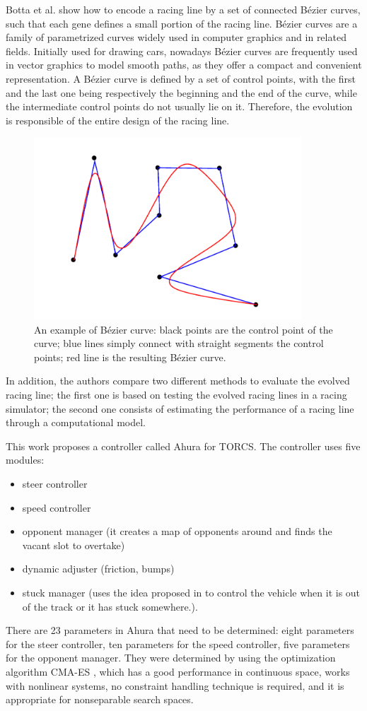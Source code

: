 Botta et al. \cite{botta} show how to encode a racing line by a set of connected B\'{e}zier curves, such that each gene defines a small portion of the racing line. B\'{e}zier curves are a family of parametrized curves widely used in computer graphics and in related fields. Initially used for drawing cars, nowadays B\'{e}zier curves are frequently used in vector graphics to model smooth paths, as they offer a compact and convenient representation.
A B\'{e}zier curve is defined by a set of control points, with the first and the last one being respectively the beginning and the end of the curve, while the intermediate control points do not usually lie on it. Therefore, the evolution is responsible of the entire design of the racing line.  
  \begin{figure}

    \centering
      \includegraphics[width=10cm]{./img/bezier}
     \caption{An example of B\'{e}zier curve: black points are the control point of the curve; blue lines simply connect with straight segments the control points; red line is the resulting B\'{e}zier curve.}
  \end{figure}
In addition, the authors compare two different methods to evaluate the evolved racing line; the first one is based on testing the evolved racing lines in a racing simulator; the second one consists of estimating the performance of a racing line through a computational model.
	
This work \cite{ahura} proposes a controller called Ahura for TORCS.
The controller uses five modules: 
\begin{itemize}
\item steer controller
\item speed controller
\item opponent manager (it creates a map of opponents around  and finds the vacant slot to overtake)
\item dynamic adjuster (friction, bumps)
\item stuck manager (uses the idea proposed in to control the vehicle when it is out of the track or it has stuck somewhere.).
\end{itemize}
There are 23 parameters in Ahura that need to be determined: eight parameters for the steer controller, ten parameters for the speed controller, five parameters for the opponent manager.
They were determined by using the optimization algorithm CMA-ES \cite{cmaes}, which has a good performance in continuous space, works with nonlinear systems, no constraint handling technique is required, and it is appropriate for nonseparable search spaces.



